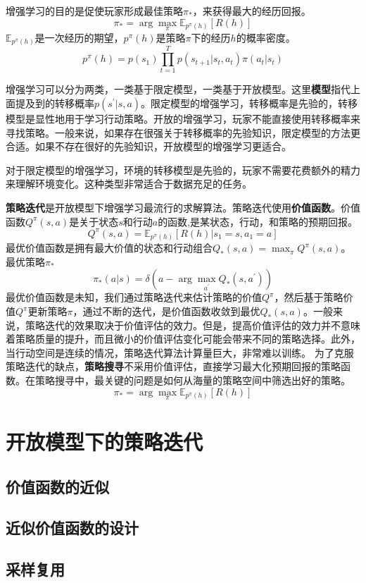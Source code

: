 增强学习的目的是促使玩家形成最佳策略$\pi_*$，来获得最大的经历回报。
$$\pi_* = \arg \max_{\pi} \mathbb{E}_{p^{\pi}(h)} [R(h)]$$
$\mathbb{E}_{p^{\pi}(h)}$是一次经历的期望，${p^{\pi}(h)}$是策略$\pi$下的经历$h$的概率密度。
$$p^\pi(h)=p(s_1)\prod_{t=1}^T p(s_{t+1}|s_t,a_t)\pi(a_t|s_t)$$

增强学习可以分为两类，一类基于限定模型，一类基于开放模型。这里\textbf{模型}指代上面提及到的转移概率$p(s^\prime|s,a)$。限定模型的增强学习，转移概率是先验的，转移模型是显性地用于学习行动策略。开放的增强学习，玩家不能直接使用转移概率来寻找策略。一般来说，如果存在很强关于转移概率的先验知识，限定模型的方法更合适。如果不存在很好的先验知识，开放模型的增强学习更适合。

对于限定模型的增强学习，环境的转移模型是先验的，玩家不需要花费额外的精力来理解环境变化。这种类型非常适合于数据充足的任务。

\textbf{策略迭代}是开放模型下增强学习最流行的求解算法。策略迭代使用\textbf{价值函数}。价值函数$Q^\pi(s,a)$是关于状态$s$和行动$a$的函数,是某状态，行动，和策略的预期回报。
$$Q^\pi(s,a) = \mathbb{E}_{p^{\pi}(h)} [R(h)|s_1 =s,a_1=a] $$
最优价值函数是拥有最大价值的状态和行动组合$Q_*(s,a) = \max_{\pi} Q^\pi(s,a) $。最优策略$\pi_*$
$$\pi_*(a|s) = \delta(a - \arg \max_{a^\prime} Q_*(s,a^\prime) )$$
最优价值函数是未知，我们通过策略迭代来估计策略的价值$Q^\pi$，然后基于策略价值$Q^\pi$更新策略$\pi$，通过不断的迭代，是价值函数收敛到最优$Q_*(s,a)$。一般来说，策略迭代的效果取决于价值评估的效力。但是，提高价值评估的效力并不意味着策略质量的提升，而且微小的价值评估变化可能会带来不同的策略选择。此外，当行动空间是连续的情况，策略迭代算法计算量巨大，非常难以训练。
为了克服策略迭代的缺点，\textbf{策略搜寻}不采用价值评估，直接学习最大化预期回报的策略函数。在策略搜寻中，最关键的问题是如何从海量的策略空间中筛选出好的策略。
$$\pi_* = \arg \max_{\pi} \mathbb{E}_{p^{\pi}(h)} [R(h)]$$


\chapter{开放模型下的策略迭代} 

\section{价值函数的近似}
\section{近似价值函数的设计}
\section{采样复用}
